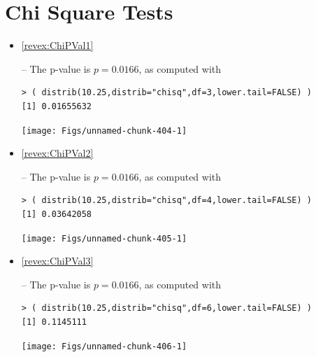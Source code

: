 \documentclass[10pt,openany]{book}\usepackage[]{graphicx}\usepackage[]{color}
\makeatletter
\newenvironment{kframe}{%
 \def\at@end@of@kframe{}%
 \ifinner\ifhmode%
  \def\at@end@of@kframe{\end{minipage}}%
  \begin{minipage}{\columnwidth}%
 \fi\fi%
 \def\FrameCommand##1{\hskip\@totalleftmargin \hskip-\fboxsep
 \colorbox{shadecolor}{##1}\hskip-\fboxsep
     \hskip-\linewidth \hskip-\@totalleftmargin \hskip\columnwidth}%
 \MakeFramed {\advance\hsize-\width
   \@totalleftmargin\z@ \linewidth\hsize
   \@setminipage}}%
 {\par\unskip\endMakeFramed%
 \at@end@of@kframe}
\newenvironment{knitrout}{}{} %
\makeatother
\begin{document}
\section*{Chi Square Tests}
\begin{itemize}
  \item \hypertarget{ans:ChiPVal1}{\ref{revex:ChiPVal1}} -- The p-value is $p=0.0166$, as computed with
\begin{knitrout}
\color{fgcolor}\begin{kframe}
\begin{verbatim}
> ( distrib(10.25,distrib="chisq",df=3,lower.tail=FALSE) )
[1] 0.01655632
\end{verbatim}
\end{kframe}

{\centering \texttt{[image: Figs/unnamed-chunk-404-1]} 

}



\end{knitrout}
  \item \hypertarget{ans:ChiPVal2}{\ref{revex:ChiPVal2}} -- The p-value is $p=0.0166$, as computed with
\begin{knitrout}
\color{fgcolor}\begin{kframe}
\begin{verbatim}
> ( distrib(10.25,distrib="chisq",df=4,lower.tail=FALSE) )
[1] 0.03642058
\end{verbatim}
\end{kframe}

{\centering \texttt{[image: Figs/unnamed-chunk-405-1]} 

}



\end{knitrout}
  \item \hypertarget{ans:ChiPVal3}{\ref{revex:ChiPVal3}} -- The p-value is $p=0.0166$, as computed with
\begin{knitrout}
\color{fgcolor}\begin{kframe}
\begin{verbatim}
> ( distrib(10.25,distrib="chisq",df=6,lower.tail=FALSE) )
[1] 0.1145111
\end{verbatim}
\end{kframe}

{\centering \texttt{[image: Figs/unnamed-chunk-406-1]} 

}
\end{knitrout}
\end{itemize}
\end{document}
